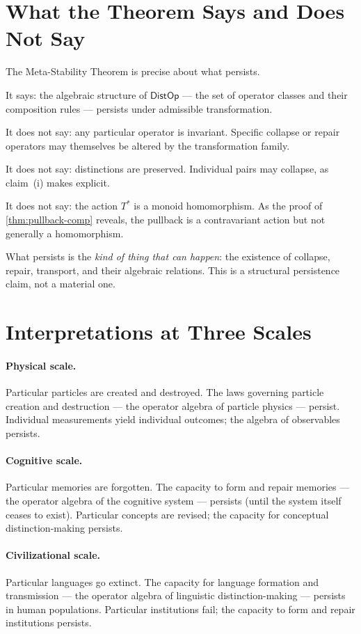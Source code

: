 \documentclass[12pt,twoside,openright]{book}
\newcommand{\distOp}{\mathsf{DistOp}}
\begin{document}
\section{What the Theorem Says and Does Not Say}

The Meta-Stability Theorem is precise about what persists.

It says: the algebraic structure of $\distOp$ --- the set of
operator classes and their composition rules --- persists under
admissible transformation.

It does not say: any particular operator is invariant.
Specific collapse or repair operators may themselves be altered
by the transformation family.

It does not say: distinctions are preserved. Individual pairs
may collapse, as claim~(i) makes explicit.

It does not say: the action $T^*$ is a monoid homomorphism.
As the proof of \cref{thm:pullback-comp} reveals, the pullback
is a contravariant action but not generally a homomorphism.

What persists is the \emph{kind of thing that can happen}: the
existence of collapse, repair, transport, and their algebraic
relations. This is a structural persistence claim, not a
material one.

\section{Interpretations at Three Scales}

\paragraph{Physical scale.} Particular particles are created
and destroyed. The laws governing particle creation and
destruction --- the operator algebra of particle physics ---
persist. Individual measurements yield individual outcomes;
the algebra of observables persists.

\paragraph{Cognitive scale.} Particular memories are forgotten.
The capacity to form and repair memories --- the operator
algebra of the cognitive system --- persists (until the system
itself ceases to exist). Particular concepts are revised; the
capacity for conceptual distinction-making persists.

\paragraph{Civilizational scale.} Particular languages go
extinct. The capacity for language formation and transmission
--- the operator algebra of linguistic distinction-making ---
persists in human populations. Particular institutions fail;
the capacity to form and repair institutions persists.
\end{document}
